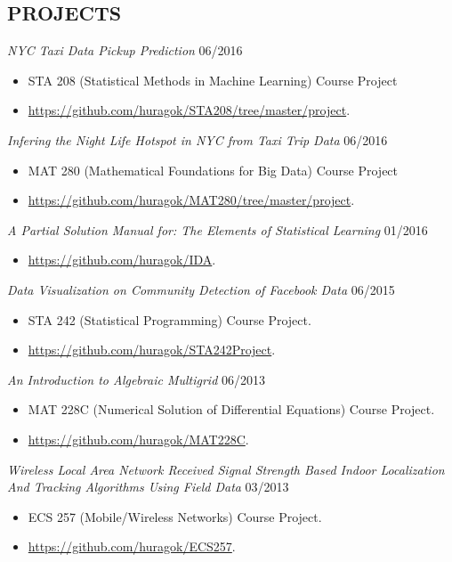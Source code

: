 \documentclass[margin]{res} %
\begin{document}
\begin{resume}
        \section{PROJECTS}
        {\sl NYC Taxi Data Pickup Prediction} \hfill 06/2016
        \begin{itemize} 
          \item STA 208 (Statistical Methods in Machine Learning) Course Project 
          \item \url{https://github.com/huragok/STA208/tree/master/project}.
        \end{itemize}
        
        {\sl Infering the Night Life Hotspot in NYC from Taxi Trip Data} \hfill
        06/2016
        \begin{itemize} 
          \item MAT 280 (Mathematical Foundations for Big Data) Course Project 
          \item \url{https://github.com/huragok/MAT280/tree/master/project}.
        \end{itemize}
        
        {\sl A Partial Solution Manual for: The Elements of Statistical Learning
        } \hfill 01/2016
        \begin{itemize} 
            \item \url{https://github.com/huragok/IDA}.
        \end{itemize}
        
        {\sl Data Visualization on Community Detection of Facebook Data}
        \hfill 06/2015
        \begin{itemize} 
            \item STA 242 (Statistical Programming) Course Project.
            \item \url{https://github.com/huragok/STA242Project}.
        \end{itemize}
        
        {\sl An Introduction to Algebraic Multigrid}
        \hfill 06/2013
        \begin{itemize} 
            \item MAT 228C (Numerical Solution of Differential Equations) Course
            Project.
            \item \url{https://github.com/huragok/MAT228C}.
        \end{itemize}
        
        {\sl Wireless Local Area Network Received Signal
        Strength Based Indoor Localization And Tracking Algorithms Using Field
        Data} \hfill 03/2013
        \begin{itemize} 
            \item ECS 257 (Mobile/Wireless Networks) Course Project.
            \item \url{https://github.com/huragok/ECS257}.
        \end{itemize}
        

\end{resume}
\end{document}
